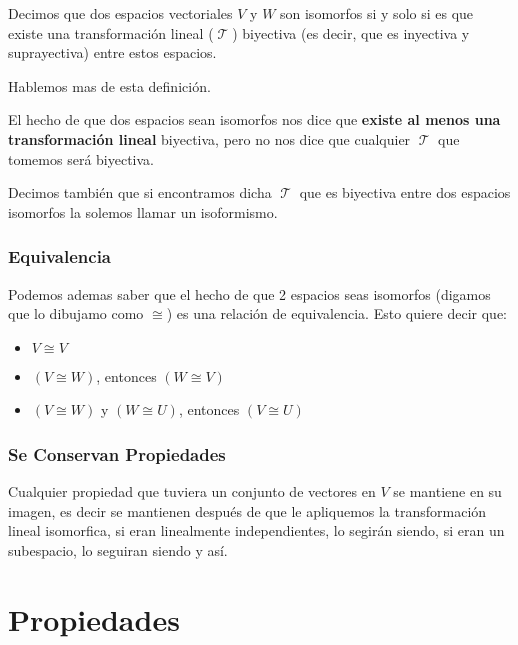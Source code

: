 \documentclass[12pt]{report}                                    %
\DeclareMathOperator \LT {\mathcal{T}}                          %
\begin{document}
        Decimos que dos espacios vectoriales $V$ y $W$ son isomorfos si y solo si es que existe
        una transformación lineal ($\LT$) biyectiva (es decir, que es inyectiva y suprayectiva)
        entre estos espacios.

        Hablemos mas de esta definición.

        El hecho de que dos espacios sean isomorfos nos dice que \textbf{existe al menos una transformación lineal}
        biyectiva, pero no nos dice que cualquier $\LT$ que tomemos será biyectiva.

        Decimos también que si encontramos dicha $\LT$ que es biyectiva entre dos espacios isomorfos la solemos
        llamar un isoformismo.

        \subsubsection{Equivalencia}

        Podemos ademas saber que el hecho de que 2 espacios seas isomorfos
        (digamos que lo dibujamo como $\cong$) es una relación de equivalencia.
        Esto quiere decir que:

        \begin{itemize}
            \item $V \cong V$
            \item $(V \cong W)$, entonces $(W \cong V)$
            \item $(V \cong W)$ y $(W \cong U)$, entonces $(V \cong U)$
        \end{itemize}


        \subsubsection{Se Conservan Propiedades}

        Cualquier propiedad que tuviera un conjunto de vectores en $V$ se mantiene
        en su imagen, es decir se mantienen después de que le apliquemos la
        transformación lineal isomorfica, si eran linealmente independientes, lo segirán siendo,
        si eran un subespacio, lo seguiran siendo y así.


    \clearpage
    \section{Propiedades}
\end{document}
